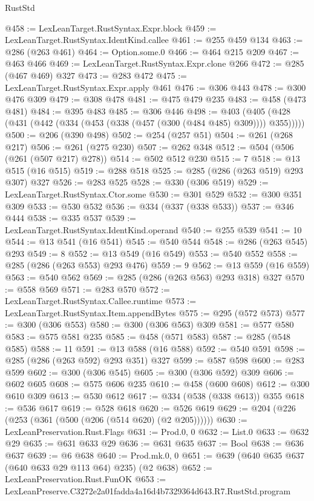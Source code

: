 \begin{lexlean}{RustStd}
\begin{coremodule}
@458 := LexLeanTarget.RustSyntax.Expr.block
@459 := LexLeanTarget.RustSyntax.IdentKind.callee
@461 := @255 @459 @134
@463 := @286 (@263 @461)
@464 := Option.some.{0}
@466 := @464 @215 @209
@467 := @463 @466
@469 := LexLeanTarget.RustSyntax.Expr.clone @266
@472 := @285 (@467 @469) @327
@473 := @283 @472
@475 := LexLeanTarget.RustSyntax.Expr.apply @461
@476 := @306 @443
@478 := @300 @476 @309
@479 := @308 @478
@481 := @475 @479 @235
@483 := @458 (@473 @481)
@484 := @395 @483
@485 := @306 @446
@498 := @403 (@405 (@428 (@431 (@442 (@334 (@453 (@338 (@457 (@300 (@484 @485) @309)))) @355)))))
@500 := @206 (@390 @498)
@502 := @254 (@257 @51)
@504 := @261 (@268 @217)
@506 := @261 (@275 @230)
@507 := @262 @348
@512 := @504 (@506 (@261 (@507 @217) @278))
@514 := @502 @512 @230
@515 := 7
@518 := @13 @515 (@16 @515)
@519 := @288 @518
@525 := @285 (@286 (@263 @519) @293 @307) @327
@526 := @283 @525
@528 := @330 (@306 @519)
@529 := LexLeanTarget.RustSyntax.Ctor.some
@530 := @301 @529
@532 := @300 @351 @309
@533 := @530 @532
@536 := @334 (@337 (@338 @533))
@537 := @346 @444
@538 := @335 @537
@539 := LexLeanTarget.RustSyntax.IdentKind.operand
@540 := @255 @539
@541 := 10
@544 := @13 @541 (@16 @541)
@545 := @540 @544
@548 := @286 (@263 @545) @293
@549 := 8
@552 := @13 @549 (@16 @549)
@553 := @540 @552
@558 := @285 (@286 (@263 @553) @293 @476)
@559 := 9
@562 := @13 @559 (@16 @559)
@563 := @540 @562
@569 := @285 (@286 (@263 @563) @293 @318) @327
@570 := @558 @569
@571 := @283 @570
@572 := LexLeanTarget.RustSyntax.Callee.runtime
@573 := LexLeanTarget.RustSyntax.Item.appendBytes
@575 := @295 (@572 @573)
@577 := @300 (@306 @553)
@580 := @300 (@306 @563) @309
@581 := @577 @580
@583 := @575 @581 @235
@585 := @458 (@571 @583)
@587 := @285 (@548 @585)
@588 := 11
@591 := @13 @588 (@16 @588)
@592 := @540 @591
@598 := @285 (@286 (@263 @592) @293 @351) @327
@599 := @587 @598
@600 := @283 @599
@602 := @300 (@306 @545)
@605 := @300 (@306 @592) @309
@606 := @602 @605
@608 := @575 @606 @235
@610 := @458 (@600 @608)
@612 := @300 @610 @309
@613 := @530 @612
@617 := @334 (@538 (@338 @613)) @355
@618 := @536 @617
@619 := @528 @618
@620 := @526 @619
@629 := @204 (@226 (@253 (@361 (@500 (@206 (@514 @620) (@2 @205))))))
@630 := LexLeanPreservation.Rust.Flags
@631 := Prod.{0, 0}
@632 := List.{0}
@633 := @632 @29
@635 := @631 @633 @29
@636 := @631 @635
@637 := Bool
@638 := @636 @637
@639 := @6 @638
@640 := Prod.mk.{0, 0}
@651 := @639 (@640 @635 @637 (@640 @633 @29 @113 @64) @235) (@2 @638)
@652 := LexLeanPreservation.Rust.FunOK
@653 := LexLeanPreserve.C3272e2a01fadda4a16d4b7329364d643.R7.RustStd.program

\end{coremodule}
\end{lexlean}
